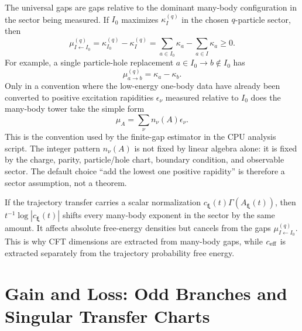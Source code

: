 \documentclass[aps,prb,onecolumn,nofootinbib,superscriptaddress]{revtex4-2}
\newcommand{\bxi}{{\boldsymbol{\xi}}}
\theoremstyle{plain}
\theoremstyle{definition}
\begin{document}
The universal gaps are gaps relative to the dominant many-body configuration
in the sector being measured.  If \(I_0\) maximizes \(\kappa_I^{(q)}\) in the
chosen \(q\)-particle sector, then
\begin{equation}
  \mu_{I\leftarrow I_0}^{(q)}
  =
  \kappa_{I_0}^{(q)}-\kappa_I^{(q)}
  =
  \sum_{a\in I_0}\kappa_a-\sum_{a\in I}\kappa_a
  \ge 0 .
  \label{eq:many-body-gap-difference-of-sums}
\end{equation}
For example, a single particle-hole replacement \(a\in I_0\to b\notin I_0\)
has
\begin{equation}
  \mu_{a\to b}^{(q)}=\kappa_a-\kappa_b .
  \label{eq:particle-hole-gap}
\end{equation}
Only in a convention where the low-energy one-body data have already been
converted to positive excitation rapidities
\(\epsilon_\nu\) measured relative to \(I_0\) does the many-body tower take the
simple form
\begin{equation}
  \mu_A=\sum_\nu n_\nu(A)\epsilon_\nu .
  \label{eq:excitation-rapidity-tower}
\end{equation}
This is the convention used by the finite-gap estimator in the CPU analysis
script.  The integer pattern \(n_\nu(A)\) is not fixed by linear algebra alone:
it is fixed by the charge, parity, particle/hole chart, boundary condition,
and observable sector.  The default choice ``add the lowest one positive
rapidity'' is therefore a sector assumption, not a theorem.

If the trajectory transfer carries a scalar normalization
\(c_\bxi(t)\Gamma(A_\bxi(t))\), then \(t^{-1}\log|c_\bxi(t)|\) shifts every
many-body exponent in the sector by the same amount.  It affects absolute
free-energy densities but cancels from the gaps
\(\mu_{I\leftarrow I_0}^{(q)}\).  This is why CFT dimensions are extracted
from many-body gaps, while \(c_{\rm eff}\) is extracted separately from the
trajectory probability free energy.

\section{Gain and Loss: Odd Branches and Singular Transfer Charts}
\label{sec:gain-loss}
\end{document}
